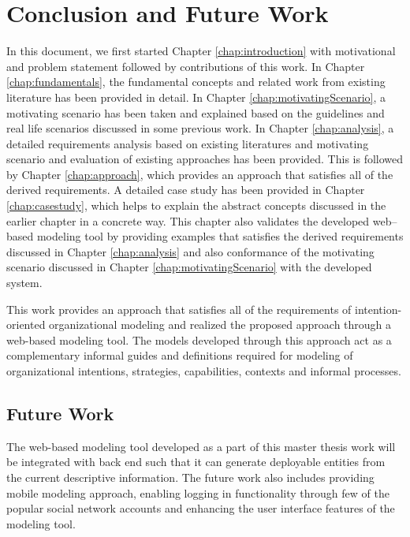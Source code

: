 \chapter{Conclusion and Future Work}
\label{chap:conclusion}

In this document, we first started Chapter \ref{chap:introduction} with motivational and problem statement followed by contributions of this work. In Chapter \ref{chap:fundamentals}, the fundamental concepts and related work from existing literature has been provided in detail. In Chapter \ref{chap:motivatingScenario}, a motivating scenario has been taken and explained based on the guidelines and real life scenarios discussed in some previous work. In Chapter \ref{chap:analysis}, a detailed requirements analysis based on existing literatures and motivating scenario and evaluation of existing approaches has been provided. This is followed by Chapter \ref{chap:approach}, which provides an approach that satisfies all of the derived requirements. A detailed case study has been provided in Chapter \ref{chap:casestudy}, which helps to explain the abstract concepts discussed in the earlier chapter in a concrete way. This chapter also validates the developed web–based modeling tool by providing examples that satisfies the derived requirements discussed in Chapter \ref{chap:analysis} and also conformance of the motivating scenario discussed in Chapter \ref{chap:motivatingScenario} with the developed system.

This work provides an approach that satisfies all of the requirements of intention-oriented organizational modeling and realized the proposed approach through a web-based modeling tool. The models developed through this approach act as a complementary informal guides and definitions required for modeling of organizational intentions, strategies, capabilities, contexts and informal processes. 

\section*{Future Work}
\label{sec:futurework}
The web-based modeling tool developed as a part of this master thesis work will be integrated with back end such that it can generate deployable entities from the current descriptive information. The future work also includes providing mobile modeling approach, enabling logging in functionality through few of the popular social network accounts and enhancing the user interface features of the modeling tool. 





